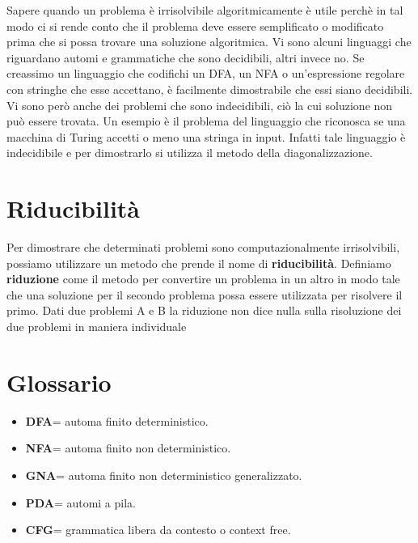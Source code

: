 \documentclass[a4paper]{extarticle}
\begin{document}
Sapere quando un problema è irrisolvibile algoritmicamente è utile perchè in tal modo ci si rende conto che il problema deve essere semplificato o modificato prima che si possa trovare una soluzione algoritmica. Vi sono alcuni linguaggi che riguardano automi e grammatiche che sono decidibili, altri invece no. Se creassimo un linguaggio che codifichi un DFA, un NFA o un'espressione regolare con stringhe che esse accettano, è facilmente dimostrabile che essi siano decidibili. Vi sono però anche dei problemi che sono indecidibili, ciò la cui soluzione non può essere trovata. Un esempio è il problema del linguaggio che riconosca se una macchina di Turing accetti o meno una stringa in input. Infatti tale linguaggio è indecidibile e per dimostrarlo si utilizza il metodo della diagonalizzazione. 

\newpage
\section{Riducibilità}
Per dimostrare che determinati problemi sono computazionalmente irrisolvibili, possiamo utilizzare un metodo che prende il nome di \textbf{riducibilità}. Definiamo \textbf{riduzione} come il metodo per convertire un problema  in un altro in modo tale che una soluzione per il secondo problema possa essere utilizzata per risolvere il primo. Dati due problemi A e B la riduzione non dice nulla sulla risoluzione dei due problemi in maniera individuale














\newpage
\section{Glossario}
\begin{itemize}
\item \textbf{DFA}= automa finito deterministico.
\item \textbf{NFA}= automa finito non deterministico.
\item \textbf{GNA}= automa finito non deterministico generalizzato.
\item \textbf{PDA}= automi a pila.
\item \textbf{CFG}= grammatica libera da contesto o context free.

\end{itemize}
 
\end{document}
